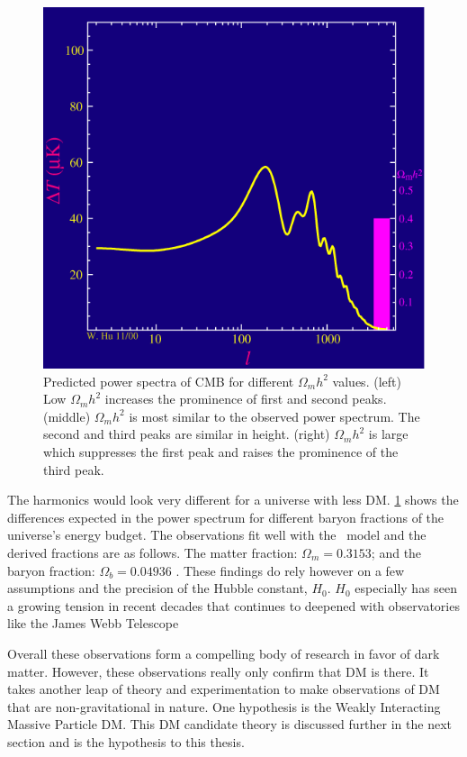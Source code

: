 \begin{figure}[ht]
{        \includegraphics[scale=0.285]{figures/LCDM_multipole/frame_16_delay-0.2s.png}
        \caption{Predicted power spectra of CMB for different $\Omega_m h^2$ values. (left) Low $\Omega_m h^2$ increases the prominence of first and second peaks. (middle) $\Omega_m h^2$ is most similar to the observed power spectrum. The second and third peaks are similar in height. (right) $\Omega_mh^2$ is large which suppresses the first peak and raises the prominence of the third peak.}
        \label{fig:CMB_vibratemodes}
    }
\end{figure}

The harmonics would look very different for a universe with less DM.
\cref{fig:CMB_vibratemodes} shows the differences expected in the power spectrum for different baryon fractions of the universe's energy budget.
The observations fit well with the \lcdm~model and the derived fractions are as follows.
The matter fraction: $\Omega_m = 0.3153$; and the baryon fraction: $\Omega_b = 0.04936$ \cite{Plank:CMB}.
These findings do rely however on a few assumptions and the precision of the Hubble constant, $H_0$.
$H_0$ especially has seen a growing tension in recent decades that continues to deepened with observatories like the James Webb Telescope \cite{JWST:hubble_tension,Freedman:hubble_tension}

Overall these observations form a compelling body of research in favor of dark matter.
However, these observations really only confirm that DM is there.
It takes another leap of theory and experimentation to make observations of DM that are non-gravitational in nature.
One hypothesis is the Weakly Interacting Massive Particle DM.
This DM candidate theory is discussed further in the next section and is the hypothesis to this thesis.

